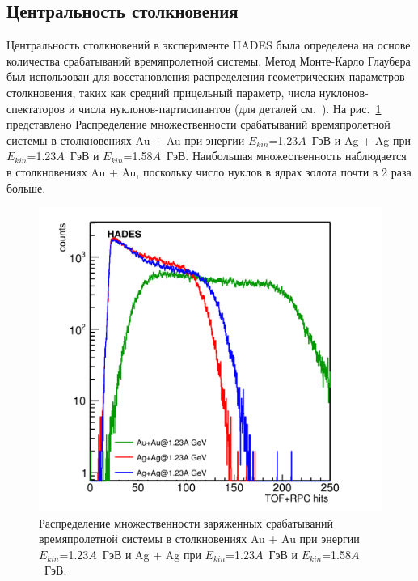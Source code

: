 \subsection{Центральность столкновения}

Центральность столкновений в эксперименте HADES была определена на основе количества срабатываний времяпролетной системы.
Метод Монте-Карло Глаубера был использован для восстановления распределения геометрических параметров столкновения, таких как средний прицельный параметр, числа нуклонов-спектаторов и числа нуклонов-партисипантов (для деталей см.~\cite{HADES:2017def}).
На рис.~\ref{fig:hades_multiplicity} представлено Распределение множественности срабатываний времяпролетной системы в столкновениях Au + Au при энергии $E_{kin}$=1.23$A$~ГэВ и Ag + Ag при $E_{kin}$=1.23$A$~ГэВ и $E_{kin}$=1.58$A$~ГэВ.
Наибольшая множественность наблюдается в столкновениях Au + Au, поскольку число нуклов в ядрах золота почти в 2 раза больше.
\begin{figure}[ht]
\begin{center}
    \includegraphics[width=0.95\linewidth]{images/multiplicity.png}
    \caption{Распределение множественности заряженных срабатываний времяпролетной системы в столкновениях Au + Au при энергии $E_{kin}$=1.23$A$~ГэВ и Ag + Ag при $E_{kin}$=1.23$A$~ГэВ и $E_{kin}$=1.58$A$~ГэВ.
    }
    \label{fig:hades_multiplicity}
\end{center}
\end{figure}

